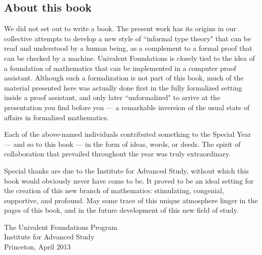\subsection*{About this book}

We did not set out to write a book. The present work has its origins in our collective attempts to develop a new style of ``informal type theory" that can be read and understood by a human being, as a complement to a formal proof that can be checked by a machine.  
Univalent Foundations is closely tied to the idea of a foundation of mathematics that can be implemented in a computer proof assistant.  Although such a formalization is not part of this book, much of the material presented here was actually done first in the fully formalized setting inside a proof assistant, and only later ``unformalized" to arrive at the presentation you find before you --- a remarkable inversion of the usual state of affairs in formalized mathematics.  

Each of the above-named individuals contributed something to the Special Year --- and so to this book --- in the form of ideas, words, or deeds.  The spirit of collaboration that prevailed throughout the year was truly extraordinary. 

\mentalpause

Special thanks are due to the Institute for Advanced Study, without which this book would obviously never have come to be.  It proved  to be an ideal setting for the creation of this new branch of mathematics: stimulating, congenial, supportive, and profound.  May some trace of this unique atmosphere linger in the pages of this book, and in the future development of this new field of study.

\bigskip

\begin{flushright}
The Univalent Foundations Program\\
Institute for Advanced Study\\
Princeton, April 2013
\end{flushright}

